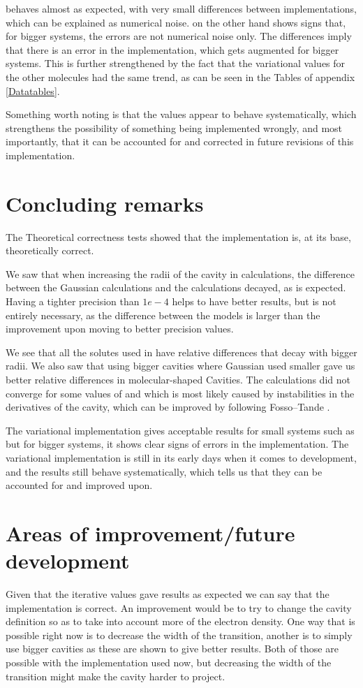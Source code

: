 \documentclass[../master_thesis.tex]{subfiles}
\begin{document}
 behaves almost as expected, with very small differences between implementations,
which can be explained as numerical noise.  on the other hand shows signs that,
for bigger systems, the errors are not numerical noise only. The  differences imply
that there is an error in the implementation, which gets augmented for bigger systems.
This is further strengthened by the fact that the variational values for the other
molecules had the same trend, as can be seen in the Tables of appendix \ref{Datatables}.

Something worth noting is that the values appear to behave systematically,
which strengthens the possibility of something being implemented wrongly, and most
importantly, that it can be accounted for and corrected in future revisions of
this implementation.

\section{Concluding remarks}
The Theoretical correctness tests showed that the implementation is, at its base,
theoretically correct.

We saw that when increasing the radii of the cavity in calculations, the difference
between the Gaussian calculations and the \mrchem calculations decayed, as is
expected.
Having a tighter precision than $1e-4$ helps to have better results, but is not entirely
necessary, as the difference between the models is larger than the improvement upon
moving to better precision values.

We see that all the solutes used in \cite{Chipman2002} have relative differences that
decay with bigger radii. We also saw that using bigger \mrchem cavities where Gaussian
used smaller gave us better relative differences in molecular-shaped Cavities.
The \mrchem calculations did not converge for some values of  and 
which is most likely caused by instabilities in the derivatives of the cavity, which
can be improved by following Fosso--Tande \cite{FossoTande:2013ka}.

The variational implementation gives acceptable results for small systems such
as  but for bigger systems, it shows clear signs of errors in the implementation.
The variational implementation is still in its early days when it comes to development,
and the results still behave systematically, which tells us that they can be accounted for and
improved upon.

\section{Areas of improvement/future development}
Given that the iterative values gave results as expected we can say that the
implementation is correct. An improvement would be to try to change the cavity
definition so as to take into account more of the electron density. One way that is
possible right now is to decrease the width of the transition, another is to simply use
bigger cavities as these are shown to give better results. Both of those are possible
with the implementation used now, but decreasing the width of the transition might
make the cavity harder to project.
\end{document}
